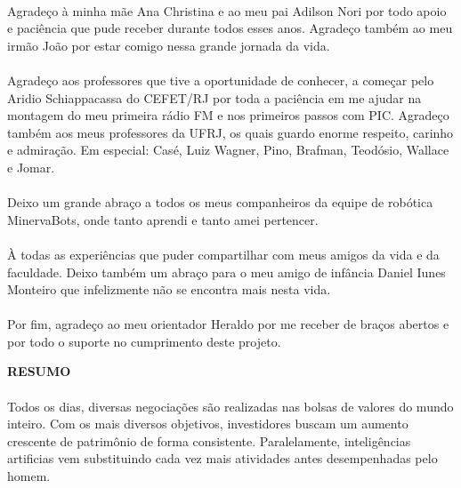 \paragraph{} Agradeço à minha mãe Ana Christina e ao meu pai Adilson Nori por todo apoio e paciência que pude receber durante todos esses anos. Agradeço também ao meu irmão João por estar comigo nessa grande jornada da vida.

\paragraph{} Agradeço aos professores que tive a oportunidade de conhecer, a começar pelo Aridio Schiappacassa do CEFET/RJ por toda a paciência em me ajudar na montagem do meu primeira rádio FM e nos primeiros passos com PIC. Agradeço também aos meus professores da UFRJ, os quais guardo enorme respeito, carinho e admiração. Em especial: Casé, Luiz Wagner, Pino, Brafman, Teodósio, Wallace e Jomar.

\paragraph{} Deixo um grande abraço a todos os meus companheiros da equipe de robótica MinervaBots, onde tanto aprendi e tanto amei pertencer.

\paragraph{} À todas as experiências que puder compartilhar com meus amigos da vida e da faculdade. Deixo também um abraço para o meu amigo de infância Daniel Iunes Monteiro que infelizmente não se encontra mais nesta vida.

\paragraph{} Por fim, agradeço ao meu orientador Heraldo por me receber de braços abertos e por todo o suporte no cumprimento deste projeto.

\pagebreak


\begin{center}
\textbf{RESUMO}
\end{center}
      \vspace{0.5cm}

\paragraph{} Todos os dias, diversas negociações são realizadas nas bolsas de valores do mundo inteiro. Com os mais diversos objetivos, investidores buscam um aumento crescente de patrimônio de forma consistente. Paralelamente, inteligências artificias vem substituindo cada vez mais atividades antes desempenhadas pelo homem.


